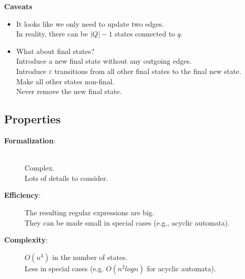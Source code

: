 \documentclass{beamer}
\begin{document}
\begin{frame}
\begin{itemize}
\begin{figure}
            \end{figure}
    

    \end{itemize}
\end{frame}

\begin{frame}
    \textbf{Caveats} \\
    \begin{itemize}
        \item
            It looks like we only need to update two edges. \\
            In reality, there can be $|Q|-1$ states connected to $q$.
        \item
            What about final states?\\
            \pause
            Introduce a new final state without any outgoing edges. \\
            Introduce $\varepsilon$ transitions from all other final states to the final new state. \\
            Make all other states non-final. \\
            Never remove the new final state.
    \end{itemize}
\end{frame}

\subsection*{Properties}
\begin{frame}
    \begin{description}
        \item[\textbf{Formalization}:] \hfill \\
            Complex.\\
            Lots of details to consider.
        \item[\textbf{Efficiency}:] 
            The resulting regular expressions are big.\\
            They can be made small in special cases (e.g., acyclic automata).

        \item[\textbf{Complexity}:]
            $O(n^3)$ in the number of states.\\
            Less in special cases (e.g. $O(n^2 log n)$ for acyclic automata).
    \end{description}
\end{frame}
\end{document}
